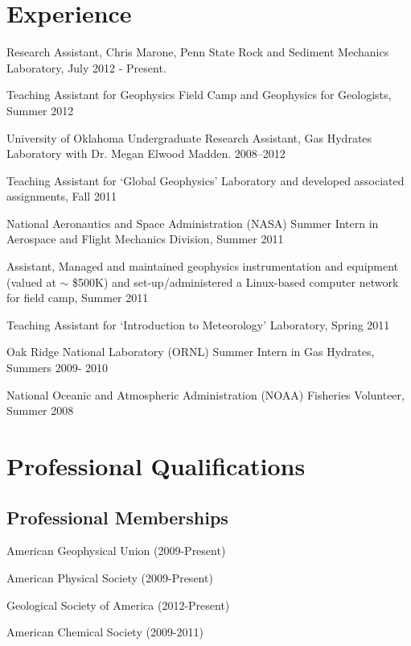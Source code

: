 \documentclass[letterpaper]{article}
\renewenvironment{itemize}{
  \begin{list}{}{
    \setlength{\leftmargin}{1.5em}
  }
}{
  \end{list}
}
\begin{document}
\section*{Experience}

\begin{itemize}
\item Research Assistant, Chris Marone, Penn State Rock and Sediment Mechanics Laboratory, July 2012 - Present.
\item Teaching Assistant for Geophysics Field Camp and Geophysics for Geologists, Summer 2012
\item University of Oklahoma Undergraduate Research Assistant, Gas Hydrates Laboratory with Dr. Megan Elwood Madden. 2008--2012
\item Teaching Assistant for `Global Geophysics' Laboratory and developed associated assignments, Fall 2011
\item National Aeronautics and Space Administration (NASA) Summer Intern in Aerospace and Flight Mechanics Division, Summer 2011
\item Assistant, Managed and maintained geophysics instrumentation and equipment (valued at $\sim$ \$500K) and set-up/administered a Linux-based computer network for field camp, Summer 2011
\item Teaching Assistant for `Introduction to Meteorology' Laboratory, Spring 2011
\item Oak Ridge National Laboratory (ORNL) Summer Intern in Gas Hydrates, Summers 2009- 2010
\item National Oceanic and Atmospheric Administration (NOAA) Fisheries Volunteer, Summer 2008
\end{itemize}

\section*{Professional Qualifications}

\subsection*{Professional Memberships}
\begin{itemize}
\item American Geophysical Union (2009-Present)
\item American Physical Society      (2009-Present)
\item Geological Society of America (2012-Present)
\item American Chemical Society    (2009-2011)
\end{itemize}
\end{document}
